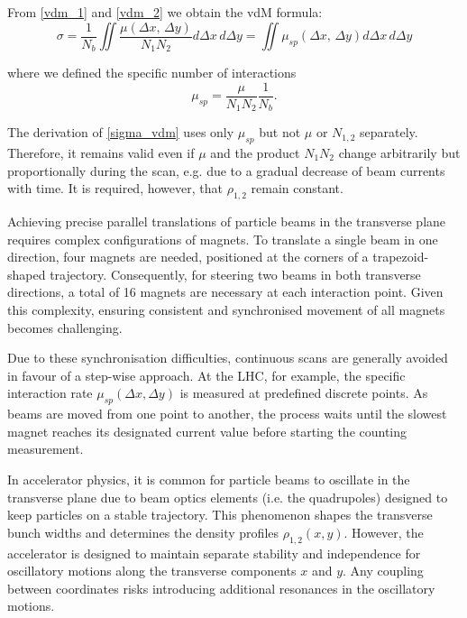 From \eqref{vdm_1} and \eqref{vdm_2} we obtain the vdM formula:
\begin{equation}
     \sigma = \frac{1}{N_b} \iint \frac{\mu (\Delta x,\, \Delta y)}{N_1N_2} d\Delta x\, d\Delta y= \iint \mu_{sp}(\Delta x,\, \Delta y)d\Delta x\, d \Delta y \label{sigma_vdm}
    \end{equation}

where we defined the specific number of interactions
\begin{equation}
\mu_{sp}=\frac{\mu}{N_1 N_2}\frac{1}{N_b}.\label{mu_sp}
\end{equation}

The derivation of \eqref{sigma_vdm} uses only $\mu _{sp}$ but not $\mu$ or $N_{1,2}$ separately. Therefore, it remains valid even if $\mu$ and the product $N_1N_2$ change arbitrarily but proportionally during the scan, e.g. due to a gradual decrease of beam currents with time. It is required, however, that $\rho_{1,2}$ remain constant.

Achieving precise parallel translations of particle beams in the transverse plane requires complex configurations of magnets. To translate a single beam in one direction, four magnets are needed, positioned at the corners of a trapezoid-shaped trajectory. Consequently, for steering two beams in both transverse directions, a total of 16 magnets are necessary at each interaction point. Given this complexity, ensuring consistent and synchronised movement of all magnets becomes challenging.

Due to these synchronisation difficulties, continuous scans are generally avoided in favour of a step-wise approach. At the LHC, for example, the specific interaction rate $\mu_{sp}(\Delta x,\Delta y)$ is measured at predefined discrete points. As beams are moved from one point to another, the process waits until the slowest magnet reaches its designated current value before starting the counting measurement.

In accelerator physics, it is common for particle beams to oscillate in the transverse plane due to beam optics elements (i.e. the quadrupoles) designed to keep particles on a stable trajectory. This phenomenon shapes the transverse bunch widths and determines the density profiles $\rho _{1,2}(x, y)$. However, the accelerator is designed to maintain separate stability and independence for oscillatory motions along the transverse components $x$ and $y$. Any coupling between coordinates risks introducing additional resonances in the oscillatory motions.

